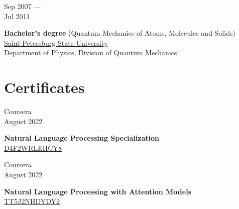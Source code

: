 \documentclass[10pt,a4paper]{article}
\newcommand{\lmpratio}{0.15}
\newcommand{\rmpratio}{0.74}
\newcommand{\horizontalSpace}{0.05\textwidth}
\newcommand{\sectionMain}[1]{\textbf{#1}}
\begin{document}
	\begin{minipage}[t]{\lmpratio\textwidth}
		Sep 2007 --- \\Jul 2011
	\end{minipage}
	\hspace{\horizontalSpace}
	\begin{minipage}[t]{\rmpratio\textwidth}
		\sectionMain{Bachelor's degree} (Quantum Mechanics of Atoms, Molecules and Solids) \\[0.1cm]
		\href{http://english.spbu.ru/}{Saint-Petersburg State University}\\ Department of Physics, Division of Quantum Mechanics
	\end{minipage}
	
	\newpage
	
	\section*{Certificates}	

        \begin{minipage}[t]{\lmpratio\textwidth}
		Coursera\\August 2022
	\end{minipage}
	\hspace{\horizontalSpace}
	\begin{minipage}[t]{\rmpratio\textwidth}
		\sectionMain{Natural Language Processing Specialization}\\
            \href{https://www.coursera.org/account/accomplishments/specialization/certificate/D4F2WRLEHCY8}{D4F2WRLEHCY8}
	\end{minipage}
	\vspace{1cm}

        \begin{minipage}[t]{\lmpratio\textwidth}
		Coursera\\August 2022
	\end{minipage}
	\hspace{\horizontalSpace}
	\begin{minipage}[t]{\rmpratio\textwidth}
		\sectionMain{Natural Language Processing with Attention Models}\\
		\href{https://www.coursera.org/account/accomplishments/certificate/TT5J2NHDYDY2}{TT5J2NHDYDY2}
	\end{minipage}
	\vspace{1cm}
\end{document}
